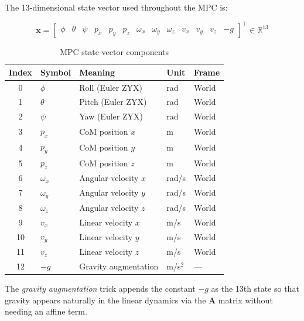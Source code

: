 \documentclass[12pt,a4paper]{report}
\newcommand{\vect}[1]{\bm{#1}}
\newcommand{\mat}[1]{\mathbf{#1}}
\newcommand{\R}{\mathbb{R}}
\begin{document}
The 13-dimensional state vector used throughout the MPC is:

\begin{equation}
    \vect{x} = \begin{bmatrix}
        \phi & \theta & \psi & p_x & p_y & p_z &
        \omega_x & \omega_y & \omega_z & v_x & v_y & v_z & {-g}
    \end{bmatrix}^\top \in \R^{13}
    \label{eq:state}
\end{equation}

\begin{table}[H]
\centering
\caption{MPC state vector components}
\begin{tabular}{cllll}
\toprule
\textbf{Index} & \textbf{Symbol} & \textbf{Meaning} & \textbf{Unit} & \textbf{Frame} \\
\midrule
0  & $\phi$     & Roll  (Euler ZYX)      & rad    & World \\
1  & $\theta$   & Pitch (Euler ZYX)      & rad    & World \\
2  & $\psi$     & Yaw   (Euler ZYX)      & rad    & World \\
3  & $p_x$      & CoM position $x$       & m      & World \\
4  & $p_y$      & CoM position $y$       & m      & World \\
5  & $p_z$      & CoM position $z$       & m      & World \\
6  & $\omega_x$ & Angular velocity $x$   & rad/s  & World \\
7  & $\omega_y$ & Angular velocity $y$   & rad/s  & World \\
8  & $\omega_z$ & Angular velocity $z$   & rad/s  & World \\
9  & $v_x$      & Linear velocity $x$    & m/s    & World \\
10 & $v_y$      & Linear velocity $y$    & m/s    & World \\
11 & $v_z$      & Linear velocity $z$    & m/s    & World \\
12 & $-g$       & Gravity augmentation   & m/s$^2$ & — \\
\bottomrule
\end{tabular}
\end{table}

The \emph{gravity augmentation} trick appends the constant $-g$ as the 13th
state so that gravity appears naturally in the linear dynamics via the
$\mat{A}$ matrix without needing an affine term.

\end{document}
